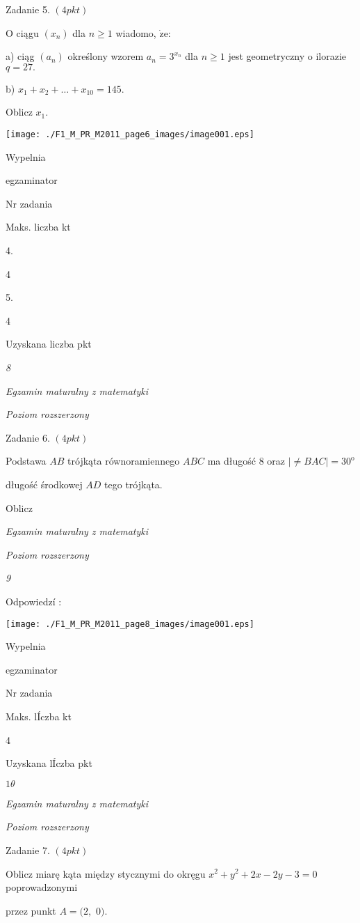 \documentclass[a4paper,12pt]{article}
\begin{document}
Zadanie 5. $(4pkt)$

$\mathrm{O}$ ciągu $(x_{n})$ dla $n\geq 1$ wiadomo, $\dot{\mathrm{z}}\mathrm{e}$:

a) ciąg $(a_{n})$ określony wzorem $a_{n}=3^{x_{n}}$ dla $n\geq 1$ jest geometryczny o ilorazie $q=27.$

b) $x_{1}+x_{2}+\ldots+x_{10}=145.$

Oblicz $x_{1}.$
\begin{center}
\texttt{[image: ./F1\_M\_PR\_M2011\_page6\_images/image001.eps]}
\end{center}
Wypelnia

egzaminator

Nr zadania

Maks. liczba kt

4.

4

5.

4

Uzyskana liczba pkt





{\it 8}

{\it Egzamin maturalny z matematyki}

{\it Poziom rozszerzony}

Zadanie 6. $(4pkt)$

Podstawa $AB$ trójkąta równoramiennego $ABC$ ma długość 8 oraz $|\neq BAC|=30^{\mathrm{o}}$

długość środkowej $AD$ tego trójkąta.

Oblicz





{\it Egzamin maturalny z matematyki}

{\it Poziom rozszerzony}

{\it 9}

Odpowiedzí :
\begin{center}
\texttt{[image: ./F1\_M\_PR\_M2011\_page8\_images/image001.eps]}
\end{center}
Wypelnia

egzaminator

Nr zadania

Maks. lÍczba kt

4

Uzyskana lÍczba pkt





$ 1\theta$

{\it Egzamin maturalny z matematyki}

{\it Poziom rozszerzony}

Zadanie 7. $(4pkt)$

Oblicz miarę kąta między stycznymi do okręgu $x^{2}+y^{2}+2x-2y-3=0$ poprowadzonymi

przez punkt $A=(2,$ 0$).$
\end{document}
